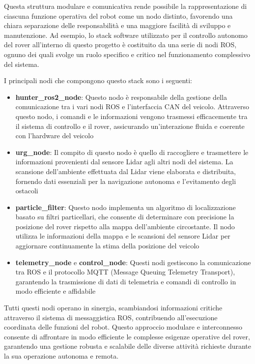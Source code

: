 \noindent Questa struttura modulare e comunicativa rende possibile la rappresentazione di ciascuna funzione operativa del robot come un nodo distinto, favorendo una chiara separazione delle responsabilità e una maggiore facilità di sviluppo e manutenzione. Ad esempio, lo stack software utilizzato per il controllo autonomo del rover all'interno di questo progetto è costituito da una serie di nodi ROS, ognuno dei quali svolge un ruolo specifico e critico nel funzionamento complessivo del sistema.

\color{red}
\noindent I principali nodi che compongono questo stack sono i seguenti:

\begin{itemize}
  \item \textbf{hunter\_ros2\_node}: Questo nodo è responsabile della gestione della comunicazione tra i vari nodi ROS e l'interfaccia CAN del veicolo. Attraverso questo nodo, i comandi e le informazioni vengono trasmessi efficacemente tra il sistema di controllo e il rover, assicurando un'interazione fluida e coerente con l'hardware del veicolo

  \item \textbf{urg\_node}: Il compito di questo nodo è quello di raccogliere e trasmettere le informazioni provenienti dal sensore Lidar agli altri nodi del sistema. La scansione dell'ambiente effettuata dal Lidar viene elaborata e distribuita, fornendo dati essenziali per la navigazione autonoma e l'evitamento degli ostacoli

  \item \textbf{particle\_filter}: Questo nodo implementa un algoritmo di localizzazione basato su filtri particellari, che consente di determinare con precisione la posizione del rover rispetto alla mappa dell'ambiente circostante. Il nodo utilizza le informazioni della mappa e le scansioni del sensore Lidar per aggiornare continuamente la stima della posizione del veicolo

  \item \textbf{telemetry\_node} e \textbf{control\_node}: Questi nodi gestiscono la comunicazione tra ROS e il protocollo MQTT (Message Queuing Telemetry Transport), garantendo la trasmissione di dati di telemetria e comandi di controllo in modo efficiente e affidabile
\end{itemize}

\noindent Tutti questi nodi operano in sinergia, scambiandosi informazioni critiche attraverso il sistema di messaggistica ROS, contribuendo all'esecuzione coordinata delle funzioni del robot. Questo approccio modulare e interconnesso consente di affrontare in modo efficiente le complesse esigenze operative del rover, garantendo una gestione robusta e scalabile delle diverse attività richieste durante la sua operazione autonoma e remota.

